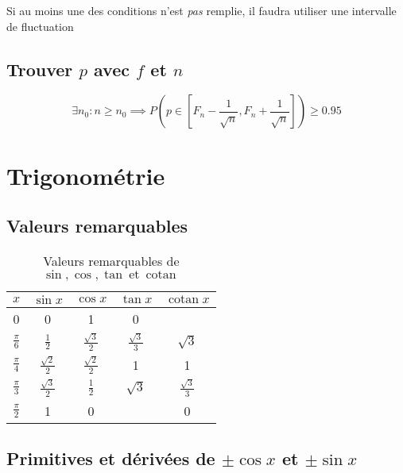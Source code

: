 \documentclass{article}
\newcommand{\cotan}{\operatorname{cotan}}
\newcommand{\et}{\:\text{et}\:}
\begin{document}
Si au moins une des conditions n'est \emph{pas} remplie,
il faudra utiliser une intervalle de fluctuation

\subsection{Trouver $p$ avec $f$ et $n$}
\[
	\exists n_0 : n \ge n_0 
	\implies P\left(p \in \left[ 
		F_n- \frac{1}{\sqrt{n} }, 
		F_n+\frac{1}{\sqrt{n} } 
	\right] \right) \ge 0.95
\] 

\newpage\section{Trigonométrie}

\subsection{Valeurs remarquables}
\begin{table}[h]
	\centering
	\caption{Valeurs remarquables de $\sin, \cos, \tan \et \cotan$}
	\label{tab:valeurs-remarquables-sin-cos-tan-cotan}
	\begin{tabular}{c | cccc}
$x$ & $\sin x$ & $\cos x$  & $\tan x$ & $\cotan x$ \\\hline
0 & 0 & 1 & 0 & \\
$\frac{\pi}{6}$ & $\frac{1}{2}$ & $ \frac{\sqrt{3} }{2} $ & $\frac{\sqrt{3} }{3}$  & $\sqrt{3}$\\
$\frac{\pi}{4}$ & $\frac{\sqrt{2} }{2}$ & $\frac{\sqrt{2} }{2}$ & 1 & 1 \\
$\frac{\pi}{3}$ & $\frac{\sqrt{3} }{2}$ & $\frac{1}{2}$ & $  \sqrt{3}  $ & $\frac{\sqrt{3} }{3}$ \\
$\frac{\pi}{2}$ & 1 & 0 & & 0 \\
	\end{tabular}
\end{table}

\subsection{Primitives et dérivées de $\pm\cos x$ et $\pm\sin x$}

\begin{figure}[h]
	\centering
	\label{fig:cercle_primitives_derivees_sin_cos}
\end{figure}
\end{document}
